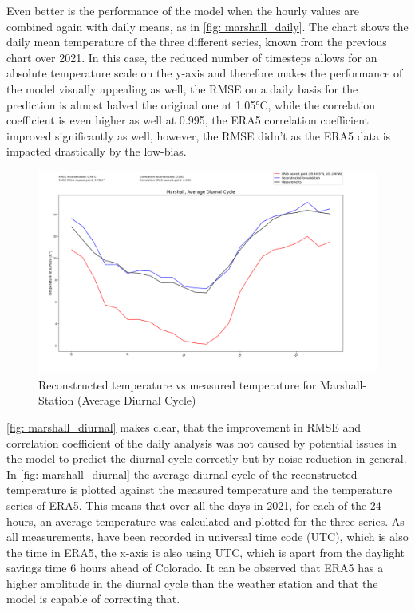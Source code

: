 Even better is the performance of the model when the hourly values are combined again with daily means, as in \autoref{fig: marshall_daily}. The chart shows the daily mean temperature of the three different series, known from the previous chart over 2021. In this case, the reduced number of timesteps allows for an absolute temperature scale on the y-axis and therefore makes the performance of the model visually appealing as well, the RMSE on a daily basis for the prediction is almost halved the original one at 1.05°C, while the correlation coefficient is even higher as well at 0.995, the ERA5 correlation coefficient improved significantly as well, however, the RMSE didn't as the ERA5 data is impacted drastically by the low-bias.

\begin{figure}
    \centering
    \includegraphics[width=1.02\textwidth]{resources/images/charts/marshall_eval_grib_final/Marshall, Average Diurnal Cycle.png}
    \caption{Reconstructed temperature vs measured temperature for Marshall-Station (Average Diurnal Cycle)}
    \label{fig: marshall_diurnal}
\end{figure}

\autoref{fig: marshall_diurnal} makes clear, that the improvement in RMSE and correlation coefficient of the daily analysis was not caused by potential issues in the model to predict the diurnal cycle correctly but by noise reduction in general. In \autoref{fig: marshall_diurnal} the average diurnal cycle of the reconstructed temperature is plotted against the measured temperature and the temperature series of ERA5. This means that over all the days in 2021, for each of the 24 hours, an average temperature was calculated and plotted for the three series. As all measurements, have been recorded in universal time code (UTC), which is also the time in ERA5, the x-axis is also using UTC, which is apart from the daylight savings time 6 hours ahead of Colorado. It can be observed that ERA5 has a higher amplitude in the diurnal cycle than the weather station and that the model is capable of correcting that.

